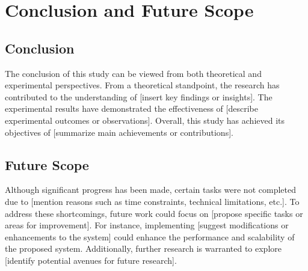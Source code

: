 

	\chapter{Conclusion and Future Scope}
	
	\section{Conclusion}
	The conclusion of this study can be viewed from both theoretical and experimental perspectives. From a theoretical standpoint, the research has contributed to the understanding of [insert key findings or insights]. The experimental results have demonstrated the effectiveness of [describe experimental outcomes or observations]. Overall, this study has achieved its objectives of [summarize main achievements or contributions].
	
	\section{Future Scope}
	Although significant progress has been made, certain tasks were not completed due to [mention reasons such as time constraints, technical limitations, etc.]. To address these shortcomings, future work could focus on [propose specific tasks or areas for improvement]. For instance, implementing [suggest modifications or enhancements to the system] could enhance the performance and scalability of the proposed system. Additionally, further research is warranted to explore [identify potential avenues for future research].
	
